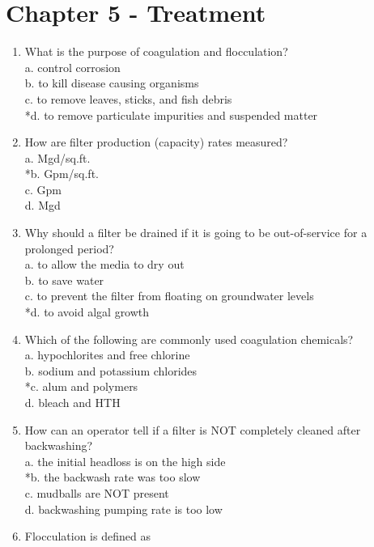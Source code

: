 \section{Chapter 5 - Treatment}
\begin{enumerate}[1.]

\item What is the purpose of coagulation and flocculation?\\
a. control corrosion\\
b. to kill disease causing organisms\\
c. to remove leaves, sticks, and fish debris\\
*d. to remove particulate impurities and suspended matter\\
\item How are filter production (capacity) rates measured?\\
a. Mgd/sq.ft.\\
*b. Gpm/sq.ft.\\
c. Gpm\\
d. Mgd\\
\item Why should a filter be drained if it is going to be out-of-service for a prolonged period?\\
a. to allow the media to dry out\\
b. to save water\\
c. to prevent the filter from floating on groundwater levels\\
*d. to avoid algal growth\\
\item Which of the following are commonly used coagulation chemicals?\\
a. hypochlorites and free chlorine\\
b. sodium and potassium chlorides\\
*c. alum and polymers\\
d. bleach and HTH\\
\item How can an operator tell if a filter is NOT completely cleaned after backwashing?\\
a. the initial headloss is on the high side\\
*b. the backwash rate was too slow\\
c. mudballs are NOT present\\
d. backwashing pumping rate is too low\\
\item Flocculation is defined as\\

\end{enumerate}
